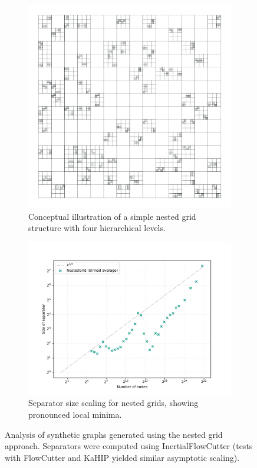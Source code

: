 \begin{figure}[tbhp]
	\centering
	\begin{subfigure}[t]{0.38\linewidth}
		\centering
		\includegraphics[width=\linewidth]{graphics/nestedgrid.pdf}
		\caption{Conceptual illustration of a simple nested grid structure with four hierarchical levels.}
		\label{fig:nested_grid_viz}
	\end{subfigure}
	\hfill
	\begin{subfigure}[t]{0.55\linewidth}
		\centering
		\includegraphics[width=\linewidth]{graphics/sep-nestedgrid.pdf}
		\caption{Separator size scaling for nested grids, showing pronounced local minima.}
		\label{fig:nested_grid_sep_plot}
	\end{subfigure}
	\caption{Analysis of synthetic graphs generated using the nested grid approach. Separators were computed using InertialFlowCutter (tests with FlowCutter and KaHIP yielded similar asymptotic scaling).}
	\label{fig:nested_grid_analysis}
\end{figure}

